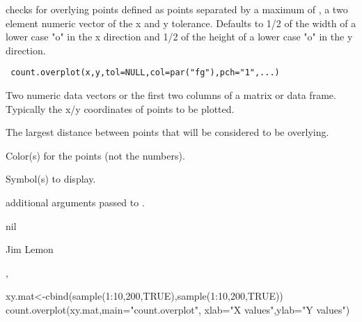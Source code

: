 \begin{Description}\relax
{} checks for overlying points defined as points
separated by a maximum of , a two element numeric vector of
the x and y tolerance.  Defaults to 1/2 of the width of a lower case 
"o" in the x direction and 1/2 of the height of a lower case "o" in 
the y direction.
\end{Description}
\begin{Usage}
\begin{verbatim}
 count.overplot(x,y,tol=NULL,col=par("fg"),pch="1",...)
\end{verbatim}
\end{Usage}
\begin{Arguments}
\begin{ldescription}
\item[\code{x,y}] Two numeric data vectors or the first two columns of a matrix
or data frame. Typically the x/y coordinates of points to be plotted.
\item[\code{tol}] The largest distance between points that will be considered
to be overlying.
\item[\code{col}] Color(s) for the points (not the numbers).
\item[\code{pch}] Symbol(s) to display.
\item[\code{...}] additional arguments passed to .
\end{ldescription}
\end{Arguments}
\begin{Value}
nil
\end{Value}
\begin{Author}\relax
Jim Lemon
\end{Author}
\begin{SeeAlso}\relax
{},
\end{SeeAlso}
\begin{Examples}
\begin{ExampleCode}
 xy.mat<-cbind(sample(1:10,200,TRUE),sample(1:10,200,TRUE))
 count.overplot(xy.mat,main="count.overplot",
  xlab="X values",ylab="Y values")
\end{ExampleCode}
\end{Examples}

